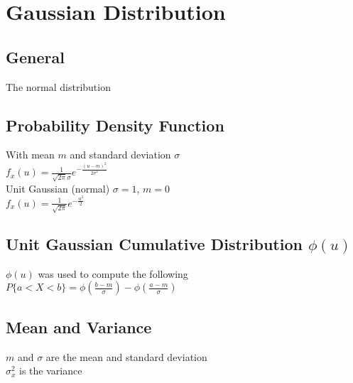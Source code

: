 \section*{Gaussian Distribution}

\subsection*{General}
The normal distribution

\subsection*{Probability Density Function}
With mean $m$ and standard deviation $\sigma$ \\
$f_x(u)=\frac{1}{\sqrt{2\pi}\sigma}e^{-\frac{(u-m)^2}{2\sigma^2}}$ \\
Unit Gaussian (normal) $\sigma = 1$, $m=0$ \\
$f_x(u)=\frac{1}{\sqrt{2\pi}}e^{-\frac{u^2}{2}}$

\subsection*{Unit Gaussian Cumulative Distribution $\phi(u)$}
$\phi(u)$ was used to compute the following \\
$P\{a<X<b\}=\phi(\frac{b-m}{\sigma})-\phi(\frac{a-m}{\sigma})$

\subsection*{Mean and Variance}
$m$ and $\sigma$ are the mean and standard deviation \\
$\sigma_x^2$ is the variance
    

